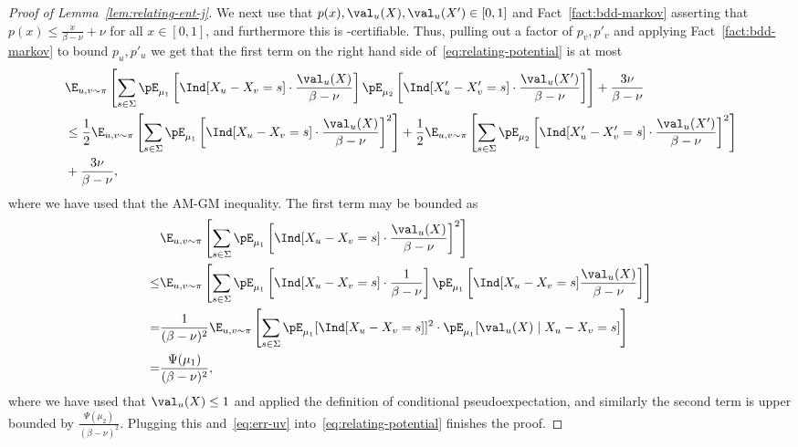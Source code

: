 \begin{proof}[Proof of Lemma~\ref{lem:relating-ent-j}]
We next use that $p(x),\val_u(X),\val_u(X') \in [0,1]$ and Fact~\ref{fact:bdd-markov} asserting that 
$p(x) \le \frac{x}{\beta-\nu} + \nu$ for all $x \in [0,1]$, and furthermore this is \sos-certifiable.
Thus, pulling out a factor of $p_v,p'_v$ and applying
Fact~\ref{fact:bdd-markov} to bound $p_u,p'_u$ we get 
that the first term on the right hand side of~\eqref{eq:relating-potential} is at most
\begin{align*}
&\E_{u,v\sim \pi}\left[\sum_{s \in \Sigma} \pE_{\mu_1}\left[\Ind[X_u - X_v = s]\cdot \frac{\val_u(X)}{\beta - \nu}\right]\pE_{\mu_{2}}\left[\Ind[X'_u - X'_v = s]\cdot \frac{\val_u(X')}{\beta - \nu}\right]\right] + \frac{3\nu}{\beta-\nu} \\
&\leq \frac{1}{2}\E_{u,v\sim \pi}\left[\sum_{s \in \Sigma} \pE_{\mu_1}\left[\Ind[X_u - X_v = s]\cdot \frac{\val_u(X)}{\beta - \nu}\right]^2\right] + \frac{1}{2}\E_{u,v\sim \pi}\left[\sum_{s \in \Sigma}\pE_{\mu_{2}}\left[\Ind[X'_u - X'_v = s]\cdot \frac{\val_u(X')}{\beta - \nu} \right]^2\right] \\
&+ \frac{3\nu}{\beta-\nu},
\end{align*}
where we have used that the AM-GM inequality. The first term may be bounded as
\begin{align*}
&\E_{u,v\sim \pi}\left[\sum_{s \in \Sigma} \pE_{\mu_1}\left[\Ind[X_u - X_v = s]\cdot \frac{\val_u(X)}{\beta - \nu}\right]^2\right] \nonumber\\
\leq&\E_{u,v\sim \pi}\left[\sum_{s \in \Sigma} \pE_{\mu_1}\left[\Ind[X_u - X_v = s]\cdot \frac{1}{\beta-\nu}\right] \pE_{\mu_1}\left[\Ind[X_u - X_v = s]\frac{\val_u(X)}{\beta - \nu}\right]\right] \nonumber \\
=&\frac{1}{(\beta-\nu)^2}\E_{u,v\sim \pi}\left[ \sum_{s \in \Sigma} \pE_{\mu_1}[\Ind[X_u - X_v = s]]^2 \cdot \pE_{\mu_1}[\val_u(X) \mid X_u - X_v = s] \right]\nonumber\\
=&\frac{\Psi(\mu_1)}{(\beta-\nu)^2},
\end{align*}
where we have used that $\val_u(X) \leq 1$ and applied the definition of conditional pseudoexpectation, 
and similarly the second term is upper bounded by $\frac{\Psi(\mu_{2})}{(\beta-\nu)^2}$. Plugging this and~\eqref{eq:err-uv} into~\eqref{eq:relating-potential} finishes the proof.
\end{proof}


